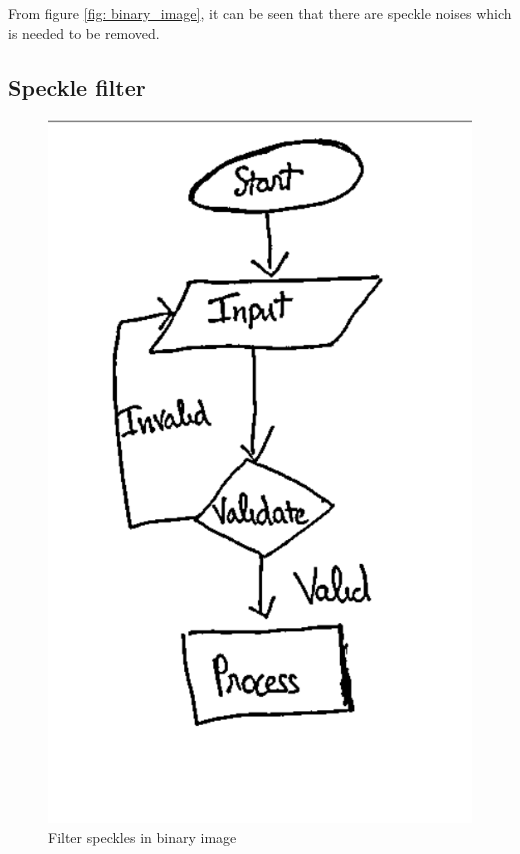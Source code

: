 From figure \ref{fig: binary_image}, it can be seen that there are speckle noises which is needed to be removed.

\subsection{Speckle filter}

\begin{figure}[t]
    \centering
    \includegraphics[scale=0.35]{Images/Preprocessing/clearBI.png}
    \caption{Filter speckles in binary image}
    \label{fig:specfilter_BI}
\end{figure}

